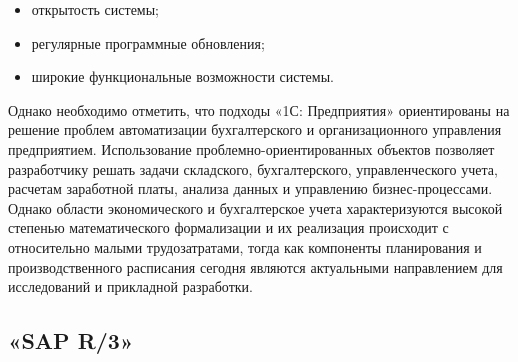 \begin{itemize}
	\item открытость системы;
	\item регулярные программные обновления;
	\item широкие функциональные возможности системы.
\end{itemize}


\indent Однако необходимо отметить, что подходы «1С: Предприятия» ориентированы на решение проблем автоматизации бухгалтерского и организационного управления предприятием.
Использование проблемно-ориентированных объектов позволяет разработчику решать задачи складского, бухгалтерского, управленческого учета, расчетам заработной платы, анализа данных и управлению бизнес-процессами.
Однако области экономического и бухгалтерское учета характеризуются высокой степенью математического формализации и их реализация происходит с относительно малыми трудозатратами, тогда как компоненты планирования и производственного расписания сегодня являются актуальными направлением для исследований и прикладной разработки.

\subsection{«SAP R/3»}

